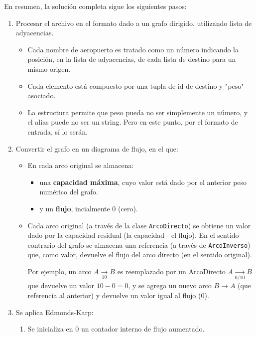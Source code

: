 \documentclass[../tp3_grupo404.tex]{subfiles}
\begin{document}
En resumen, la solución completa sigue los siguientes pasos:
\begin{enumerate}
    \item Procesar el archivo en el formato dado a un grafo dirigido, utilizando lista de adyacencias.
    \begin{itemize}
        \item Cada nombre de aeropuerto es tratado como un número indicando la posición, en la lista
        de adyacencias, de cada lista de destino para un mismo origen.
        \item Cada elemento está compuesto por una tupla de id de destino y "peso" asociado.
        \item La estructura permite que peso pueda no ser simplemente un número, y el alias puede no ser un string.
            Pero en este punto, por el formato de entrada, sí lo serán.
    \end{itemize}
    \item Convertir el grafo en un diagrama de flujo, en el que:\begin{itemize}
        \item En cada arco original se almacena:\begin{itemize}
            \item una \textbf{capacidad máxima}, cuyo valor está dado por el anterior peso numérico del grafo.
            \item y un \textbf{flujo}, incialmente 0 (cero).
        \end{itemize}
        \item Cada arco original (a través de la clase \texttt{ArcoDirecto}) se obtiene un valor dado por
            la capacidad residual (la capacidad - el flujo). En el sentido contrario del grafo se almacena
            una referencia (a través de \texttt{ArcoInverso}) que, como valor, devuelve el flujo del arco
            directo (en el sentido original).
            \par Por ejemplo, un arco $A\underset{10}{\rightarrow}B$ es reemplazado por un ArcoDirecto
            $A\underset{0/10}{\rightarrow}B$ que devuelve un valor $10-0=0$, y se agrega un nuevo arco
            $B\rightarrow A$ (que referencia al anterior) y devuelve un valor igual al flujo ($0$).
    \end{itemize}
    \item Se aplica Edmonds-Karp: \begin{enumerate}
        \item Se inicializa en 0 un contador interno de flujo aumentado.

\end{enumerate}
\end{enumerate}
\end{document}
